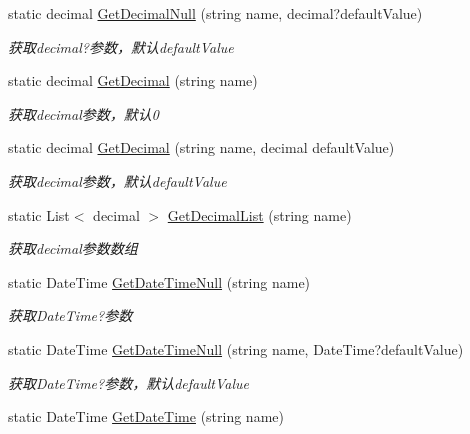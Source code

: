 \begin{DoxyCompactItemize}
static decimal \hyperlink{class_x_c_l_net_tools_1_1_string_hander_1_1_form_helper_ac94db6da5663acdc23ce3bc79ec99c12}{Get\-Decimal\-Null} (string name, decimal?default\-Value)
\begin{DoxyCompactList}\small\item\em 获取decimal?参数，默认default\-Value \end{DoxyCompactList}\item 
static decimal \hyperlink{class_x_c_l_net_tools_1_1_string_hander_1_1_form_helper_a61ef0cfc5b32dadd67700c5f307850d3}{Get\-Decimal} (string name)
\begin{DoxyCompactList}\small\item\em 获取decimal参数，默认0 \end{DoxyCompactList}\item 
static decimal \hyperlink{class_x_c_l_net_tools_1_1_string_hander_1_1_form_helper_ab147eaeb86996c9c03099a5bd6d6ac6d}{Get\-Decimal} (string name, decimal default\-Value)
\begin{DoxyCompactList}\small\item\em 获取decimal参数，默认default\-Value \end{DoxyCompactList}\item 
static List$<$ decimal $>$ \hyperlink{class_x_c_l_net_tools_1_1_string_hander_1_1_form_helper_ab3f5108e85eb8bf10ab5317e77bc1f2c}{Get\-Decimal\-List} (string name)
\begin{DoxyCompactList}\small\item\em 获取decimal参数数组 \end{DoxyCompactList}\item 
static Date\-Time \hyperlink{class_x_c_l_net_tools_1_1_string_hander_1_1_form_helper_a420660ded9f4960446f03cede154198b}{Get\-Date\-Time\-Null} (string name)
\begin{DoxyCompactList}\small\item\em 获取\-Date\-Time?参数 \end{DoxyCompactList}\item 
static Date\-Time \hyperlink{class_x_c_l_net_tools_1_1_string_hander_1_1_form_helper_afd47b664fbbce54d65a5e06ec963ddfd}{Get\-Date\-Time\-Null} (string name, Date\-Time?default\-Value)
\begin{DoxyCompactList}\small\item\em 获取\-Date\-Time?参数，默认default\-Value \end{DoxyCompactList}\item 
static Date\-Time \hyperlink{class_x_c_l_net_tools_1_1_string_hander_1_1_form_helper_ab9b36d4dac916c94303c01b1006bc558}{Get\-Date\-Time} (string name)

\end{DoxyCompactItemize}
